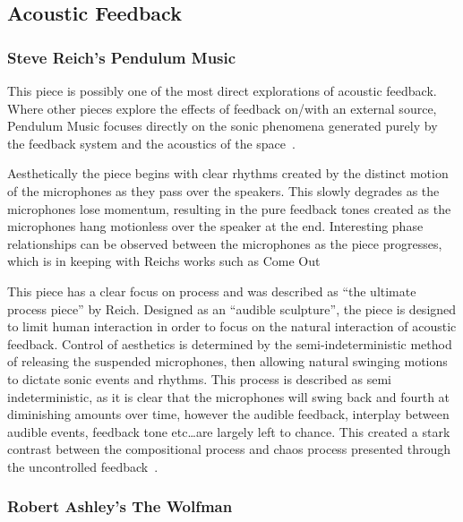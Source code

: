 \documentclass[titlepage]{scrartcl}
\begin{document}
    \subsection{Acoustic Feedback}
    \subsubsection{Steve Reich's Pendulum Music~\parencite[p.31]{reich2002wom}}\label{pendulum} 
    This piece is possibly one of the most direct explorations of acoustic
    feedback. Where other pieces explore the effects of feedback on/with an external source,
    Pendulum Music focuses directly on the sonic phenomena generated purely by
    the feedback system and the acoustics of the space~\parencite[p.50-51]{weisert2010ioi}.

    Aesthetically the piece begins with clear rhythms created by the distinct
    motion of the microphones as they pass over the speakers. This slowly
    degrades as the microphones lose momentum, resulting in the pure feedback
    tones created as the microphones hang motionless over the speaker at the
    end. Interesting phase relationships can be observed between the
    microphones as the piece progresses, which is in keeping with Reichs works
    such as Come Out~\citeyearpar{reich1966comeout}

    This piece has a clear focus on process and was described as ``the ultimate
    process piece'' by Reich.  Designed as an ``audible sculpture'', the piece is
    designed to limit human interaction in order to focus on the natural
    interaction of acoustic feedback. Control of aesthetics is determined by
    the semi-indeterministic method of releasing the suspended microphones,
    then allowing natural swinging motions to dictate sonic events and rhythms.
    This process is described as semi indeterministic, as it is clear that the
    microphones will swing back and fourth at diminishing amounts over time,
    however the audible feedback, interplay between audible events, feedback
    tone etc\ldots are largely left to chance. This created a stark contrast
    between the compositional process and chaos process presented through the
    uncontrolled feedback~\parencite[p.186]{holmes2012eaem}.
    
    
    \subsubsection{Robert Ashley's The Wolfman~\citeyearpar{ashley2003w}}\label{wolfman} 
    
\end{document}
